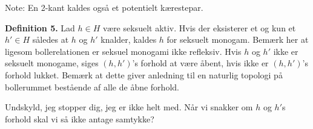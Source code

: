 \documentclass[a4paper,11pt]{article}
\begin{document}
\begin{sketch}
 Note: En 2-kant kaldes også et potentielt kærestepar.

 \textbf{Definition 5.} Lad $h \in H$ være seksuelt aktiv. Hvis der eksisterer et og kun et $h' \in H$ således at $h$ og $h'$ knalder, kaldes $h$ for seksuelt monogam. Bemærk her at ligesom bollerelationen er seksuel monogami ikke refleksiv. Hvis $h$ og $h'$ ikke er seksuelt monogame, siges $(h, h')$'s forhold at være åbent, hvis ikke er $(h, h')$'s forhold lukket. Bemærk at dette giver anledning til en naturlig topologi på bollerummet bestående af alle de åbne forhold.

 Undskyld, jeg stopper dig, jeg er ikke helt med. Når vi snakker om $h$ og $h'$s forhold skal vi så ikke antage samtykke?

\end{sketch}
\end{document}
